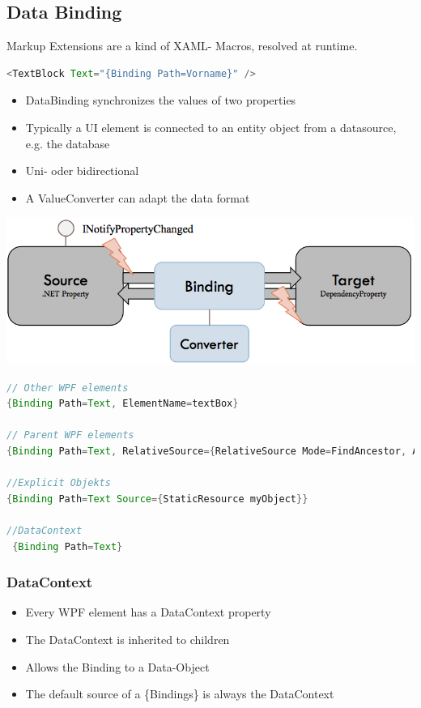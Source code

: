 \documentclass[10pt]{article}
\begin{document}
\subsection{Data Binding}
Markup Extensions are a kind of XAML- Macros, resolved at runtime.
\begin{lstlisting}[language=Java, caption=Data Binding, style=JavaStyle]
<TextBlock Text="{Binding Path=Vorname}" />
\end{lstlisting}
\begin{itemize}
	\item DataBinding synchronizes the values of two properties
	\item Typically a UI element is connected to an entity object from a datasource, e.g. the database
	\item Uni- oder bidirectional
	\item A ValueConverter can adapt the data format
\end{itemize}
\begin{center}
	\includegraphics[scale=0.25]{xaml_dataBinding.png}
\end{center}
\begin{lstlisting}[language=Java, caption=Sources Data Binding, style=JavaStyle]
// Other WPF elements
{Binding Path=Text, ElementName=textBox}

// Parent WPF elements
{Binding Path=Text, RelativeSource={RelativeSource Mode=FindAncestor, AncestorType=ListBox}}

//Explicit Objekts
{Binding Path=Text Source={StaticResource myObject}}

//DataContext
 {Binding Path=Text}
\end{lstlisting}
\subsubsection{DataContext}
\begin{itemize}
	\item Every WPF element has a DataContext property
	\item The DataContext is inherited to children
	\item Allows the Binding to a Data-Object
	\item The default source of a \{Bindings\} is always the DataContext
\end{itemize}
\end{document}
